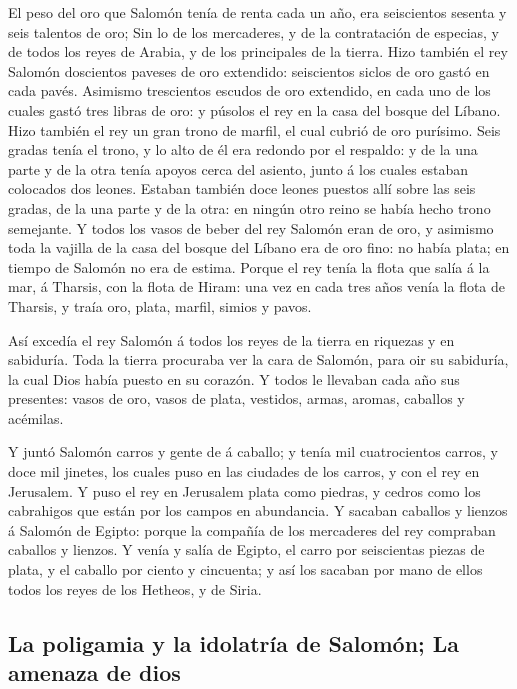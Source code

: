  El peso del oro que Salomón tenía de renta cada un año,
era seiscientos sesenta y seis talentos de oro;  Sin lo
de los mercaderes, y de la contratación de especias, y de todos los
reyes de Arabia, y de los principales de la tierra.  Hizo
también el rey Salomón doscientos paveses de oro extendido: seiscientos
siclos de oro gastó en cada pavés.  Asimismo trescientos
escudos de oro extendido, en cada uno de los cuales gastó tres libras de
oro: y púsolos el rey en la casa del bosque del Líbano. 
Hizo también el rey un gran trono de marfil, el cual cubrió de oro
purísimo.  Seis gradas tenía el trono, y lo alto de él
era redondo por el respaldo: y de la una parte y de la otra tenía apoyos
cerca del asiento, junto á los cuales estaban colocados dos leones.
 Estaban también doce leones puestos allí sobre las seis
gradas, de la una parte y de la otra: en ningún otro reino se había
hecho trono semejante.  Y todos los vasos de beber del
rey Salomón eran de oro, y asimismo toda la vajilla de la casa del
bosque del Líbano era de oro fino: no había plata; en tiempo de Salomón
no era de estima.  Porque el rey tenía la flota que salía
á la mar, á Tharsis, con la flota de Hiram: una vez en cada tres años
venía la flota de Tharsis, y traía oro, plata, marfil, simios y pavos.

 Así excedía el rey Salomón á todos los reyes de la
tierra en riquezas y en sabiduría.  Toda la tierra
procuraba ver la cara de Salomón, para oir su sabiduría, la cual Dios
había puesto en su corazón.  Y todos le llevaban cada año
sus presentes: vasos de oro, vasos de plata, vestidos, armas, aromas,
caballos y acémilas.

 Y juntó Salomón carros y gente de á caballo; y tenía mil
cuatrocientos carros, y doce mil jinetes, los cuales puso en las
ciudades de los carros, y con el rey en Jerusalem.  Y
puso el rey en Jerusalem plata como piedras, y cedros como los
cabrahigos que están por los campos en abundancia.  Y
sacaban caballos y lienzos á Salomón de Egipto: porque la compañía de
los mercaderes del rey compraban caballos y lienzos.  Y
venía y salía de Egipto, el carro por seiscientas piezas de plata, y el
caballo por ciento y cincuenta; y así los sacaban por mano de ellos
todos los reyes de los Hetheos, y de Siria.

\hypertarget{la-poligamia-y-la-idolatruxeda-de-salomuxf3n-la-amenaza-de-dios}{%
\subsection{La poligamia y la idolatría de Salomón; La amenaza de
dios}\label{la-poligamia-y-la-idolatruxeda-de-salomuxf3n-la-amenaza-de-dios}}

